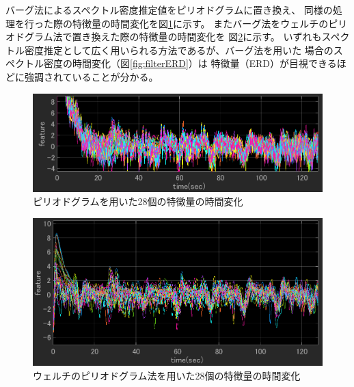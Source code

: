バーグ法によるスペクトル密度推定値をピリオドグラムに置き換え、
同様の処理を行った際の特徴量の時間変化を図\ref{fig:fftERD}に示す。
またバーグ法をウェルチのピリオドグラム法で置き換えた際の特徴量の時間変化を
図\ref{fig:welchERD}に示す。
いずれもスペクトル密度推定として広く用いられる方法であるが、バーグ法を用いた
場合のスペクトル密度の時間変化（図\ref{fig:filterERD}）は
特徴量（ERD）が目視できるほどに強調されていることが分かる。

\begin{figure}[tp]
    \centering
    \includegraphics[width=13cm]{images/feature_sub1_fft.png}
    \caption{ピリオドグラムを用いた28個の特徴量の時間変化}
    \label{fig:fftERD}
\end{figure}
\begin{figure}[tp]
    \centering
    \includegraphics[width=13cm]{images/feature_sub1_welch.png}
    \caption{ウェルチのピリオドグラム法を用いた28個の特徴量の時間変化}
    \label{fig:welchERD}
\end{figure}

